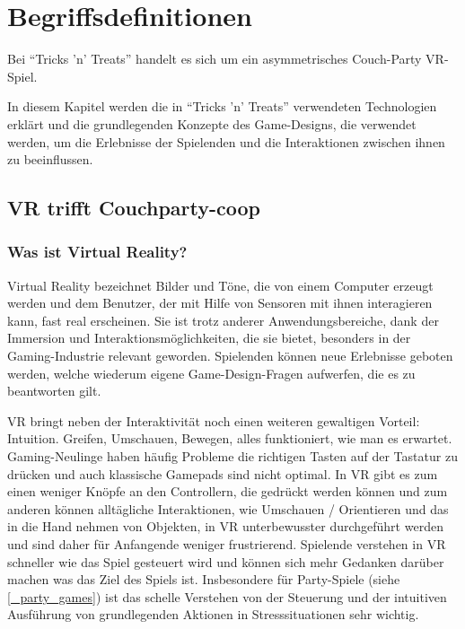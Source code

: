 \chapter{Begriffsdefinitionen}

Bei "`Tricks 'n' Treats"' handelt es sich um ein asymmetrisches Couch-Party VR-Spiel.

In diesem Kapitel werden die in "`Tricks 'n' Treats"' verwendeten Technologien erklärt und die grundlegenden Konzepte des Game-Designs, die verwendet werden, um die Erlebnisse der Spielenden und die Interaktionen zwischen ihnen zu beeinflussen.

\section{VR trifft Couchparty-coop}

\subsection{Was ist Virtual Reality?}

Virtual Reality bezeichnet Bilder und Töne, die von einem Computer erzeugt werden und dem Benutzer, der mit Hilfe von Sensoren mit ihnen interagieren kann, fast real erscheinen\cite{_oxford_dict}. Sie ist trotz anderer Anwendungsbereiche, dank der Immersion und Interaktionsmöglichkeiten, die sie bietet, besonders in der Gaming-Industrie relevant geworden\cite{_bitkom_vr}. Spielenden können neue Erlebnisse geboten werden, welche wiederum eigene Game-Design-Fragen aufwerfen, die es zu beantworten gilt.

VR bringt neben der Interaktivität noch einen weiteren gewaltigen Vorteil: Intuition. Greifen, Umschauen, Bewegen, alles funktioniert, wie man es erwartet. Gaming-Neulinge haben häufig Probleme die richtigen Tasten auf der Tastatur zu drücken und auch klassische Gamepads sind nicht optimal. In VR gibt es zum einen weniger Knöpfe an den Controllern, die gedrückt werden können und zum anderen können alltägliche Interaktionen, wie Umschauen / Orientieren und das in die Hand nehmen von Objekten, in VR unterbewusster durchgeführt werden und sind daher für Anfangende weniger frustrierend. Spielende verstehen in VR schneller wie das Spiel gesteuert wird und können sich mehr Gedanken darüber machen was das Ziel des Spiels ist\cite{_natural_interaction_in_augmented_reality_context}. Insbesondere für Party-Spiele (siehe \ref{_party_games}) ist das schelle Verstehen von der Steuerung und der intuitiven Ausführung von grundlegenden Aktionen in Stresssituationen sehr wichtig.

